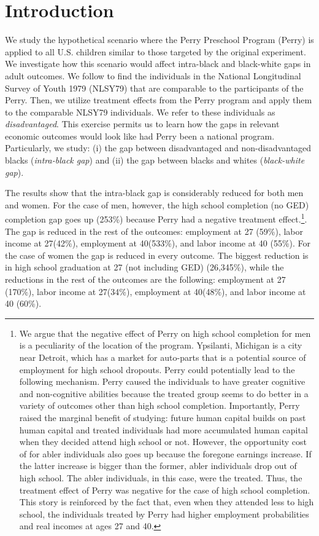 \makeatletter

\section{Introduction}
We study the hypothetical scenario where the Perry Preschool Program (Perry) is applied to all U.S. children similar to those targeted by the original experiment. We investigate how this scenario would affect intra-black and black-white gaps in adult outcomes.  We follow \citet{heckman2010analyzing} to find the individuals in the National Longitudinal Survey of Youth 1979 (NLSY79) that are comparable to the participants of the Perry. Then, we utilize treatment effects from the Perry program and apply them to the comparable NLSY79 individuals. We refer to these individuals as \emph{disadvantaged}. This exercise permits us to learn how the gaps in relevant economic outcomes would look like had Perry been a national program. Particularly, we study: (i) the gap between disadvantaged and non-disadvantaged blacks (\emph{intra-black gap}) and (ii) the gap between blacks and whites (\emph{black-white gap}). 

The results show that the intra-black gap is considerably reduced for both men and women. For the case of men, however, the high school completion (no GED) completion gap goes up (253\%) because Perry had a negative treatment effect.\footnote{We argue that the negative effect of Perry on high school completion for men is a peculiarity of the location of the program. Ypsilanti, Michigan is a city near Detroit, which has a market for auto-parts that is a potential source of employment for high school dropouts. Perry could potentially lead to the following mechanism. Perry caused the individuals to have greater cognitive and non-cognitive abilities because the treated group seems to do better in a variety of outcomes other than high school completion. Importantly, Perry raised the marginal benefit of studying: future human capital builds on past human capital and treated individuals had more accumulated human capital when they decided attend high school or not. However, the opportunity cost of for abler individuals also goes up because the foregone earnings increase. If the latter increase is bigger than the former, abler individuals drop out of high school. The abler individuals, in this case, were the treated. Thus, the treatment effect of Perry was negative for the case of high school completion. This story is reinforced by the fact that, even when they attended less to high school, the individuals treated by Perry had higher employment probabilities and real incomes at ages 27 and 40.}. The gap is reduced in the rest of the outcomes: employment at 27 (59\%), labor income at 27(42\%), employment at 40(533\%), and labor income at 40 (55\%). For the case of women the gap is reduced in every outcome. The biggest reduction is in high school graduation at 27 (not including GED) (26,345\%), while the reductions in the rest of the outcomes are the following: employment at 27 (170\%), labor income at 27(34\%), employment at 40(48\%), and labor income at 40 (60\%). 

